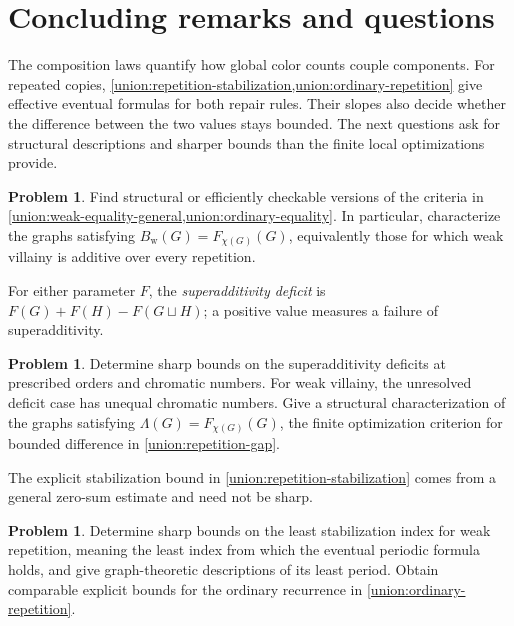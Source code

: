 \documentclass[10pt,a4paper]{amsart}
\numberwithin{equation}{section}
\theoremstyle{definition}
\newtheorem{problem}[theorem]{Problem}
\theoremstyle{remark}
\begin{document}
\section{Concluding remarks and questions}\label{sec:questions}

The composition laws quantify how global color counts couple components.
For repeated copies, \cref{union:repetition-stabilization,union:ordinary-repetition}
give effective eventual formulas for both repair rules. Their slopes
also decide whether the difference between the two values stays bounded.
The next questions ask for structural descriptions and sharper bounds
than the finite local optimizations provide.

\begin{problem}\label{problem:union-equality}
Find structural or efficiently checkable versions of the criteria in
\cref{union:weak-equality-general,union:ordinary-equality}.
In particular, characterize the graphs satisfying
$B_{\mathrm w}(G)=F_{\chi(G)}(G)$, equivalently those for which weak
villainy is additive over every repetition.
\end{problem}

For either parameter $F$, the \emph{superadditivity deficit} is
$F(G)+F(H)-F(G\sqcup H)$; a positive value measures a failure of
superadditivity.

\begin{problem}\label{problem:union-deficits}
Determine sharp bounds on the superadditivity deficits at prescribed
orders and chromatic numbers. For weak villainy, the unresolved deficit
case has unequal chromatic numbers.
Give a structural characterization of the graphs satisfying
$\Lambda(G)=F_{\chi(G)}(G)$, the finite optimization criterion for
bounded difference in \cref{union:repetition-gap}.
\end{problem}

The explicit stabilization bound in \cref{union:repetition-stabilization}
comes from a general zero-sum estimate and need not be sharp.
\begin{problem}\label{problem:repetition-onset}
Determine sharp bounds on the least stabilization index for weak
repetition, meaning the least index from which the eventual periodic
formula holds, and give graph-theoretic descriptions of its least period.
Obtain comparable explicit bounds for the ordinary recurrence in
\cref{union:ordinary-repetition}.
\end{problem}
\end{document}
